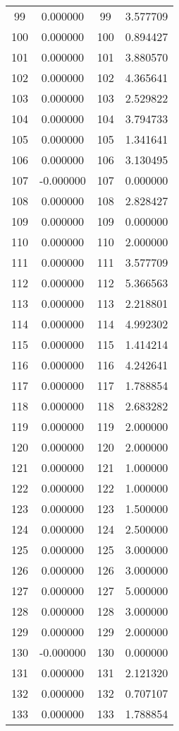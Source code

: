 \documentclass[12pt]{article}
\begin{document}
\begin{longtable}{@{}cccc@{}}
99 & 0.000000 & 99 & 3.577709 \\
100 & 0.000000 & 100 & 0.894427 \\
101 & 0.000000 & 101 & 3.880570 \\
102 & 0.000000 & 102 & 4.365641 \\
103 & 0.000000 & 103 & 2.529822 \\
104 & 0.000000 & 104 & 3.794733 \\
105 & 0.000000 & 105 & 1.341641 \\
106 & 0.000000 & 106 & 3.130495 \\
107 & -0.000000 & 107 & 0.000000 \\
108 & 0.000000 & 108 & 2.828427 \\
109 & 0.000000 & 109 & 0.000000 \\
110 & 0.000000 & 110 & 2.000000 \\
111 & 0.000000 & 111 & 3.577709 \\
112 & 0.000000 & 112 & 5.366563 \\
113 & 0.000000 & 113 & 2.218801 \\
114 & 0.000000 & 114 & 4.992302 \\
115 & 0.000000 & 115 & 1.414214 \\
116 & 0.000000 & 116 & 4.242641 \\
117 & 0.000000 & 117 & 1.788854 \\
118 & 0.000000 & 118 & 2.683282 \\
119 & 0.000000 & 119 & 2.000000 \\
120 & 0.000000 & 120 & 2.000000 \\
121 & 0.000000 & 121 & 1.000000 \\
122 & 0.000000 & 122 & 1.000000 \\
123 & 0.000000 & 123 & 1.500000 \\
124 & 0.000000 & 124 & 2.500000 \\
125 & 0.000000 & 125 & 3.000000 \\
126 & 0.000000 & 126 & 3.000000 \\
127 & 0.000000 & 127 & 5.000000 \\
128 & 0.000000 & 128 & 3.000000 \\
129 & 0.000000 & 129 & 2.000000 \\
130 & -0.000000 & 130 & 0.000000 \\
131 & 0.000000 & 131 & 2.121320 \\
132 & 0.000000 & 132 & 0.707107 \\
133 & 0.000000 & 133 & 1.788854 \\

\end{longtable}
\end{document}
